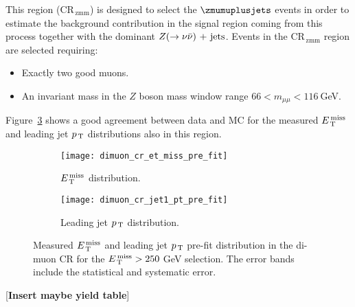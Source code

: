 This region (CR$_\mathrm{\, zmm}$) is designed to select the $\zmumuplusjets$
events in order to estimate the background contribution in the signal region
coming from this process together with the dominant $Z (\rightarrow \nu \bar{\nu})\mathrm{~+~jets}$. Events in
the CR$_\mathrm{\, zmm}$ region are selected requiring:
\begin{itemize}
\item Exactly two good muons.
\item An invariant mass in the $Z$ boson mass window range
  $66 < m_{\mu \mu} < 116~$GeV.
\end{itemize}
Figure~\ref{fig:dimuon_cr_plots} shows a good agreement between data and MC for
the measured $E_\mathrm{\, T}^\mathrm{\, miss}$ and leading jet $p_\mathrm{\, T}$ distributions also in this region.

\begin{figure}[!h]
  \centering
  \begin{subfigure}[t]{.48\linewidth}
    \texttt{[image: dimuon\_cr\_et\_miss\_pre\_fit]}
    \caption{$E_\mathrm{\, T}^\mathrm{\, miss}$ distribution.}
    \label{fig:dimuon_cr_et_miss_pre_fit}
  \end{subfigure}
  \begin{subfigure}[t]{.48\linewidth}
    \texttt{[image: dimuon\_cr\_jet1\_pt\_pre\_fit]}
    \caption{Leading jet $p_\mathrm{\, T}$ distribution.}
    \label{fig:dimuon_cr_jet1_pt_pre_fit}
  \end{subfigure}
  \caption{Measured $E_\mathrm{\, T}^\mathrm{\, miss}$ and leading jet $p_\mathrm{\, T}$ pre-fit distribution in the
    di-muon CR for the $E_\mathrm{\, T}^\mathrm{\, miss} > 250~$GeV selection. The error bands include
    the statistical and systematic error.}
  \label{fig:dimuon_cr_plots}
\end{figure}

\mbox{}

[\textbf{Insert maybe yield table}]
